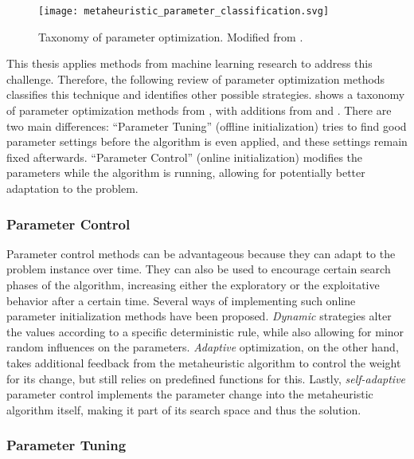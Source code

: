 \begin{figure}[h]
	\centering
	\texttt{[image: metaheuristic\_parameter\_classification.svg]}
	\caption[Taxonomy of parameter optimization]{Taxonomy of parameter optimization. Modified from \citet{eiben1999parameter}.}
	\label{fig:paramtax}
\end{figure}

This thesis applies methods from machine learning research to address this challenge. Therefore, the following review of parameter optimization methods classifies this technique and identifies other possible strategies.  shows a taxonomy of parameter optimization methods from \citet{eiben1999parameter}, with additions from \citet{talbi2009metaheuristics} and \citet{stutzle2012parameter}. There are two main differences: \enquote{Parameter Tuning} (offline initialization) tries to find good parameter settings before the algorithm is even applied, and these settings remain fixed afterwards. \enquote{Parameter Control} (online initialization) modifies the parameters while the algorithm is running, allowing for potentially better adaptation to the problem.

\subsubsection{Parameter Control}

Parameter control methods can be advantageous because they can adapt to the problem instance over time. They can also be used to encourage certain search phases of the algorithm, increasing either the exploratory or the exploitative behavior after a certain time. Several ways of implementing such online parameter initialization methods have been proposed. \textit{Dynamic} strategies alter the values according to a specific deterministic rule, while also allowing for minor random influences on the parameters. \textit{Adaptive} optimization, on the other hand, takes additional feedback from the metaheuristic algorithm to control the weight for its change, but still relies on predefined functions for this. Lastly, \textit{self-adaptive} parameter control implements the parameter change into the metaheuristic algorithm itself, making it part of its search space and thus the solution.

\subsubsection{Parameter Tuning}
\label{chap:tuning}

